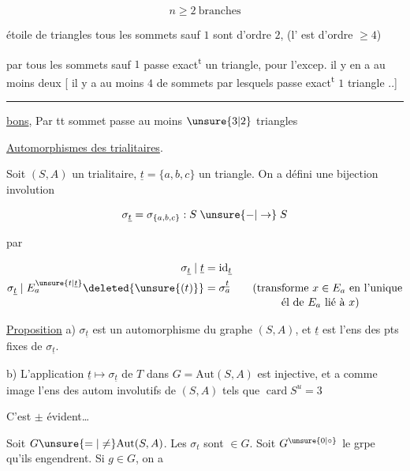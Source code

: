 \[ n\geq 2\ \text{branches} \]

 étoile de triangles   tous les sommets sauf $1$ sont d'ordre $2$,  (l' est d'ordre $\geq4$)

par tous les sommets sauf $1$ passe exact\textsuperscript{t} un triangle, pour l'excep. il y en a  au moins deux [  il y a au moins $4$ de sommets par lesquels passe  exact\textsuperscript{t} $1$ triangle ..]

\noindent\rule{\linewidth}{.4pt}

\uline{bons}, Par tt sommet passe au moins $\unsure{3|2}$ triangles

\uline{Automorphismes des   trialitaires}.

Soit $(S,A)$ un   trialitaire, $\underline t=\{a,b,c\}$ un triangle. On a défini une bijection involution 

\[ \sigma_{\underline t}=\sigma_{\{a,b,c\}}: S\mathrel{\unsure{-|\to}}S \]

par

\[
\begin{aligned}
\sigma_{\underline t}\mid\underline t&=\mathrm{id}_{\underline t}\\
\sigma_{\underline t}\mid E_a^{\unsure{t|\underline t}}\deleted{\unsure{(t)}}&=\sigma_a^{\underline t}
\qquad\text{(transforme $x\in E_a$ en l'unique}\\[-2pt]
&\hspace{7em}\text{él de $E_a$ lié à $x$)}
\end{aligned}
\]

\uline{Proposition} \qquad a) $\sigma_{\underline t}$ est un automorphisme du  graphe $(S,A)$, et $\underline t$ est l'ens des pts fixes de $\sigma_{\underline t}$.

b) L'application $\underline t\longmapsto\sigma_{\underline t}$ de $T$ dans $G=\mathrm{Aut}(S,A)$ est injective, et a comme image l'ens des autom involutifs  de $(S,A)$ tels que  $\operatorname{card} S^u=3$

C'est $\pm$ évident\ldots

Soit $G\unsure{=|\neq}\mathrm{Aut}(S,A)$. Les $\sigma_t$ sont $\in G$. Soit $G^{\unsure{0|\circ}}$ le grpe qu'ils engendrent. Si $g\in G$, on a

